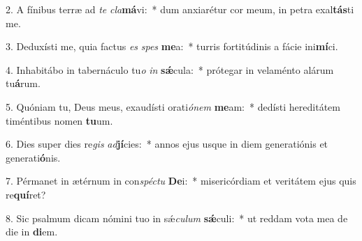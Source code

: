 2. A fínibus terræ ad \textit{te} \textit{cla}\textbf{má}vi:~*  dum anxiarétur cor meum, in petra exal\textbf{tás}ti me.\

3. Deduxísti me, quia factus \textit{es} \textit{spes} \textbf{me}a:~*  turris fortitúdinis a fácie ini\textbf{mí}ci.\

4. Inhabitábo in tabernáculo tu\textit{o} \textit{in} \textbf{sǽ}cula:~*  prótegar in velaménto alárum tu\textbf{á}rum.\

5. Quóniam tu, Deus meus, exaudísti orati\textit{ó}\textit{nem} \textbf{me}am:~*  dedísti hereditátem timéntibus nomen \textbf{tu}um.\

6. Dies super dies re\textit{gis} \textit{ad}\textbf{jí}cies:~*  annos ejus usque in diem generatiónis et generati\textbf{ó}nis.\

7. Pérmanet in ætérnum in con\textit{spéc}\textit{tu} \textbf{De}i:~*  misericórdiam et veritátem ejus quis re\textbf{quí}ret?\

8. Sic psalmum dicam nómini tuo in sǽ\textit{cu}\textit{lum} \textbf{sǽ}culi:~*  ut reddam vota mea de die in \textbf{di}em.\

